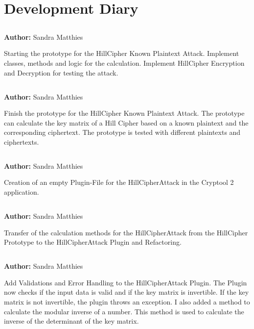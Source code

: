 \documentclass{article}
\begin{document}
\section*{Development Diary}

\subsection*{}
\textbf{Author:} Sandra Matthies

Starting the prototype for the HillCipher Known Plaintext Attack. Implement classes, methods and logic for the calculation.
Implement HillCipher Encryption and Decryption for testing the attack.

\subsection*{}
\textbf{Author:} Sandra Matthies

Finish the prototype for the HillCipher Known Plaintext Attack. The prototype can calculate the key matrix of a Hill Cipher based on a known plaintext and the corresponding ciphertext. The prototype is tested with different plaintexts and ciphertexts.

\subsection*{}
\textbf{Author:} Sandra Matthies

Creation of an empty Plugin-File for the HillCipherAttack in the Cryptool 2 application.

\subsection*{}
\textbf{Author:} Sandra Matthies

Transfer of the calculation methods for the HillCipherAttack from the HillCipher Prototype to the HillCipherAttack Plugin and Refactoring. 

\subsection*{}
\textbf{Author:} Sandra Matthies

Add Validations and Error Handling to the HillCipherAttack Plugin. The Plugin now checks if the input data is valid and if the key matrix is invertible. If the key matrix is not invertible, the plugin throws an exception. I also added a method to calculate the modular inverse of a number. This method is used to calculate the inverse of the determinant of the key matrix.
\end{document}
